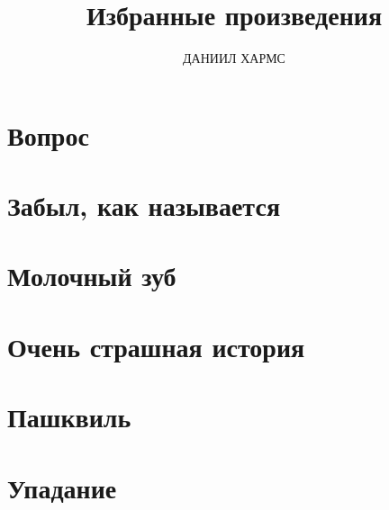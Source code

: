 \documentclass[12pt]{book}
\title{Избранные произведения}
\author{ДАНИИЛ ХАРМС}
\date{}
\begin{document}
\setlength{\parindent}{1.5cm}
\maketitle
\vspace*{-\baselineskip}

\chapter{Вопрос}


\chapter{Забыл, как называется}


\chapter{Молочный зуб}


\chapter{Очень страшная история}


\chapter{Пашквиль}


\chapter{Упадание}

\end{document}
